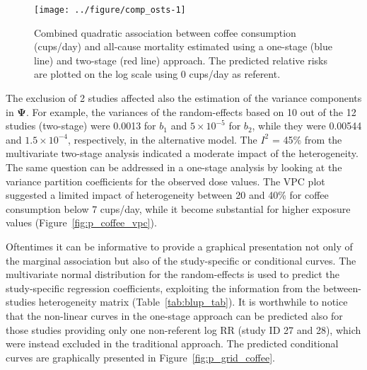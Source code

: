 \documentclass[11pt,a4paper,twoside,openany]{book}\usepackage{knitr}
\begin{document}
{{\begin{knitrout}
\begin{figure}[ht!]
{\centering \texttt{[image: ../figure/comp\_osts-1]} 

}

\caption[Combined quadratic association between coffee consumption (cups/day) and all-cause mortality estimated using a one-stage (blue line) and two-stage (red line) approach]{Combined quadratic association between coffee consumption (cups/day) and all-cause mortality estimated using a one-stage (blue line) and two-stage (red line) approach. The predicted relative risks are plotted on the log scale using 0 cups/day as referent.}\label{fig:comp_osts}
\end{figure}


\end{knitrout}

\noindent The exclusion of 2 studies affected also the estimation of the variance components in $\boldsymbol{\Psi}$. For example, the variances of the random-effects based on 10 out of the 12 studies (two-stage) were 0.0013 for $b_1$ and \ensuremath{5\times 10^{-5}} for $b_2$, while they were 0.00544 and \ensuremath{1.5\times 10^{-4}}, respectively, in the alternative model. The $I^2$ = 45\% from the multivariate two-stage analysis indicated a moderate impact of the heterogeneity. The same question can be addressed in a one-stage analysis by looking at the variance partition coefficients for the observed dose values. The VPC plot suggested a limited impact of heterogeneity between 20 and 40\% for coffee consumption below 7 cups/day, while it become substantial for higher exposure values (Figure~\ref{fig:p_coffee_vpc}).

Oftentimes it can be informative to provide a graphical presentation not only of the marginal association but also of the study-specific or conditional curves. The multivariate normal distribution for the random-effects is used to predict the study-specific regression coefficients, exploiting the information from the between-studies heterogeneity matrix (Table~\ref{tab:blup_tab}). 
It is worthwhile to notice that the non-linear curves in the one-stage approach can be predicted also for those studies providing only one non-referent log RR (study ID 27 and 28), which were instead excluded in the traditional approach. The predicted conditional curves are graphically presented in Figure~\ref{fig:p_grid_coffee}.

\begin{knitrout}\footnotesize
{}\color{fgcolor}\begin{figure}[ht!]


\end{figure}
\end{knitrout}}}
\end{document}
